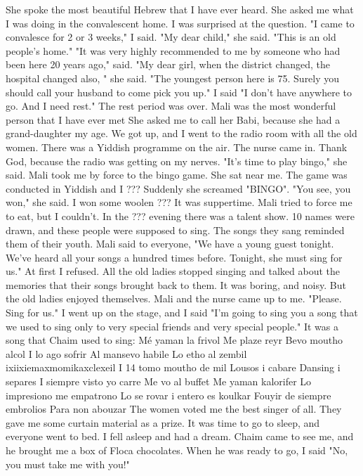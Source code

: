 She spoke the most beautiful Hebrew that I have ever heard.
She asked me what I was 
doing in the convalescent home.
I was surprised at the question.
"I came to convalesce for 2 or 3 weeks," I said.
"My dear child," she said.
"This is an old people's home."
"It was very highly recommended to me by someone who had been here 20 years ago," 
said.
"My dear girl, when the district changed, the hospital changed also, " she said.
"The youngest person here is 75.
Surely you should call your husband to come pick you 
up."
I said "I don't have anywhere to go.
And I need rest."
The rest period was over.
Mali was the most wonderful person that I have ever met 
She asked me to call her Babi, because she had a grand-daughter my age.
We got up, and 
I went to the radio room with all the old women.
There was a Yiddish programme 
on the air.
The nurse came in.
Thank God, because the radio was getting on my nerves.
"It's time to play bingo," she said.
Mali took me by force to the bingo game.
She sat near me.
The game was conducted 
in Yiddish and I ???
Suddenly she screamed "BINGO".
"You see, you won," she said.
I won some woolen ???
It was suppertime.
Mali tried to force me to eat, but I couldn't.
In the ???
evening
there was a talent show.
10 names were drawn, and these people were supposed to 
sing.
The songs they sang reminded them of their youth.
Mali said to everyone, "We 
have a young guest tonight.
We've heard all your songs a hundred times before.
Tonight, she must sing for us."
At first I refused.
All the old ladies stopped singing and talked about the memories that their 
songs brought back to them.
It was boring, and noisy.
But the old ladies enjoyed themselves.
Mali and the nurse came up to me.
"Please.
Sing for us."
I went up on the stage, and I said "I'm going to sing you a song that we used to 
sing only to very special friends and very special people."
It was a song that Chaim 
used to sing: 
Mé yaman la frivol 
Me plaze reyr 
Bevo moutho alcol 
I lo ago sofrir 
Al mansevo habile 
Lo etho al zembil 
ixiixiemaxmomikaxclexeil 
I 14 tomo moutho de mil 
Lousos i cabare 
Dansing i separes 
I siempre visto yo carre 
Me vo al buffet 
Me yaman kalorifer 
Lo impresiono me empatrono 
Lo se rovar i entero es koulkar 
Fouyir de siempre embrolios 
Para non abouzar 
The women voted me the best singer of all.
They gave me some curtain material as a 
prize.
It was time to go to sleep, and everyone went to bed.
I fell asleep and had a 
dream.
Chaim came to see me, and he brought me a box of Floca chocolates.
When he 
was ready to go, I said "No, you must take me with you!"
